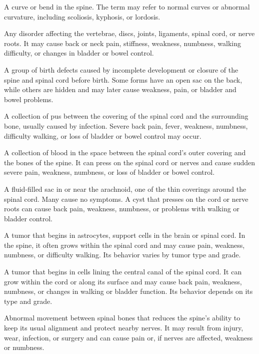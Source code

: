  A curve or bend in the spine. The term may refer to normal curves or abnormal curvature, including scoliosis, kyphosis, or lordosis.

 Any disorder affecting the vertebrae, discs, joints, ligaments, spinal cord, or nerve roots. It may cause back or neck pain, stiffness, weakness, numbness, walking difficulty, or changes in bladder or bowel control.

 A group of birth defects caused by incomplete development or closure of the spine and spinal cord before birth. Some forms have an open sac on the back, while others are hidden and may later cause weakness, pain, or bladder and bowel problems.

 A collection of pus between the covering of the spinal cord and the surrounding bone, usually caused by infection. Severe back pain, fever, weakness, numbness, difficulty walking, or loss of bladder or bowel control may occur.

 A collection of blood in the space between the spinal cord's outer covering and the bones of the spine. It can press on the spinal cord or nerves and cause sudden severe pain, weakness, numbness, or loss of bladder or bowel control.

 A fluid-filled sac in or near the
  arachnoid, one of the thin coverings around the spinal cord. Many
  cause no symptoms. A cyst that presses on the cord or nerve roots can
  cause back pain, weakness, numbness, or problems with walking or
  bladder control.

 A tumor that begins in astrocytes, support
  cells in the brain or spinal cord. In the spine, it often grows within
  the spinal cord and may cause pain, weakness, numbness, or difficulty
  walking. Its behavior varies by tumor type and grade.

 A tumor that begins in cells lining the
  central canal of the spinal cord. It can grow within the cord or along
  its surface and may cause back pain, weakness, numbness, or changes in
  walking or bladder function. Its behavior depends on its type and
  grade.

 Abnormal movement between spinal bones that
  reduces the spine's ability to keep its usual alignment and protect
  nearby nerves. It may result from injury, wear, infection, or surgery
  and can cause pain or, if nerves are affected, weakness or numbness.

